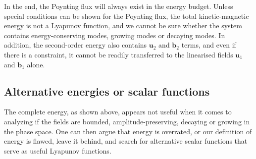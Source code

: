 %
In the end, the Poynting flux will always exist in the energy budget. Unless special conditions can be shown for the Poynting flux, the total kinetic-magnetic energy is not a Lyapunov function, and we cannot be sure whether the system contains energy-conserving modes, growing modes or decaying modes.
In addition, the second-order energy also contains $\mathbf{u}_2$ and $\mathbf{b}_2$ terms, and even if there is a constraint, it cannot be readily transferred to the linearised fields $\mathbf{u}_1$ and $\mathbf{b}_1$ alone.

\subsection{Alternative energies or scalar functions}

The complete energy, as shown above, appears not useful when it comes to analyzing if the fields are bounded, amplitude-preserving, decaying or growing in the phase space. One can then argue that energy is overrated, or our definition of energy is flawed, leave it behind, and search for alternative scalar functions that serve as useful Lyapunov functions.

